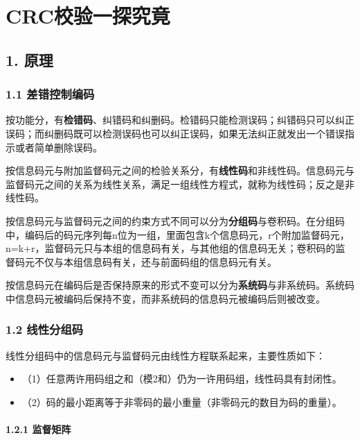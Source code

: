 \documentclass[
]{article}
\author{}
\date{}
\begin{document}
\hypertarget{header-n0}{%
\section{CRC校验一探究竟}\label{header-n0}}

\tableofcontents

\hypertarget{header-n3}{%
\subsection{1. 原理}\label{header-n3}}

\hypertarget{header-n4}{%
\subsubsection{1.1 差错控制编码}\label{header-n4}}

按功能分，有\textbf{检错码}、纠错码和纠删码。检错码只能检测误码；纠错码只可以纠正误码；而纠删码既可以检测误码也可以纠正误码，如果无法纠正就发出一个错误指示或者简单删除误码。

按信息码元与附加监督码元之间的检验关系分，有\textbf{线性码}和非线性码。信息码元与监督码元之间的关系为线性关系，满足一组线性方程式，就称为线性码；反之是非线性码。

按信息码元与监督码元之间的约束方式不同可以分为\textbf{分组码}与卷积码。在分组码中，编码后的码元序列每n位为一组，里面包含k个信息码元，r个附加监督码元，n=k+r，监督码元只与本组的信息码有关，与其他组的信息码无关；卷积码的监督码元不仅与本组信息码有关，还与前面码组的信息码元有关。

按信息码元在编码后是否保持原来的形式不变可以分为\textbf{系统码}与非系统码。系统码中信息码元被编码后保持不变，而非系统码的信息码元被编码后则被改变。

\hypertarget{header-n9}{%
\subsubsection{1.2 线性分组码}\label{header-n9}}

线性分组码中的信息码元与监督码元由线性方程联系起来，主要性质如下：

\begin{itemize}
\item
  （1）任意两许用码组之和（模2和）仍为一许用码组，线性码具有封闭性。
\item
  （2）码的最小距离等于非零码的最小重量（非零码元的数目为码的重量）。
\end{itemize}

\hypertarget{header-n16}{%
\paragraph{1.2.1 监督矩阵}\label{header-n16}}
\end{document}

